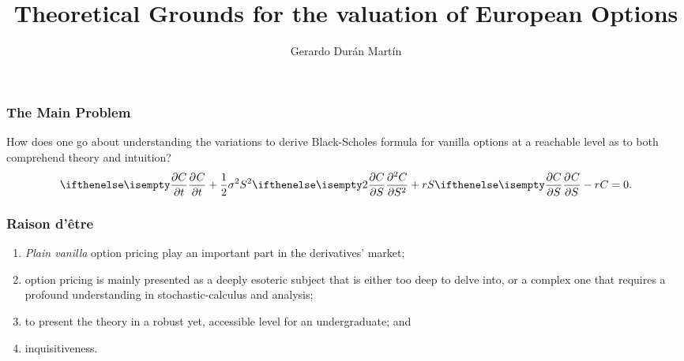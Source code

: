 \documentclass{beamer}
\title{Theoretical Grounds for the valuation of European Options}
\author{Gerardo Dur\'an Mart\'in}
\institute{Universidad Marista}
\begin{document}
\frame{\titlepage}

\begin{frame}
	\frametitle{The Main Problem}
	How does one go about understanding the variations to derive Black-Scholes formula for vanilla options at a reachable level as to both comprehend theory and intuition?
	\begin{equation}
		\partialwrt{C}{t} + \frac{1}{2}\sigma^2S^2\partialwrt[2]{C}{S} + rS\partialwrt{C}{S} - rC = 0.
	\end{equation}
\end{frame}

\begin{frame}
	\frametitle{Raison d'\^etre}
	\begin{enumerate}
		\item<1-> \textit{Plain vanilla} option pricing play an important part in the derivatives' market;
		\item<2-> option pricing is mainly presented as a deeply esoteric subject that is either too deep to delve into, or a complex one that requires a profound understanding in stochastic-calculus and analysis;
		\item<3-> to present the theory in a robust yet, accessible level for an undergraduate; and
		\item<4-> inquisitiveness.
	\end{enumerate}
\end{frame}
\end{document}
